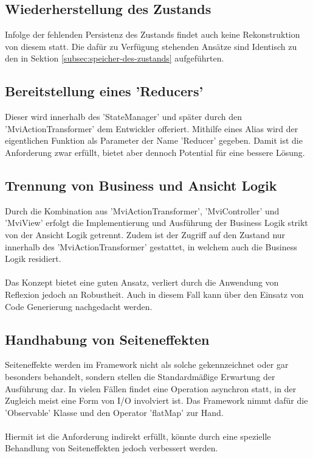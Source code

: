 \subsection{Wiederherstellung des Zustands}
Infolge der fehlenden Persistenz des Zustands findet auch keine Rekonstruktion von diesem statt. Die dafür zu Verfügung stehenden Ansätze sind Identisch zu den in Sektion
\ref{subsec:speicher-des-zustands}
aufgeführten.

\subsection{Bereitstellung eines 'Reducers'}
Dieser wird innerhalb des 'StateManager' und später durch den 'MviActionTransformer' dem Entwickler offeriert. Mithilfe eines Alias wird der eigentlichen Funktion als Parameter der Name 'Reducer' gegeben.
Damit ist die Anforderung zwar erfüllt, bietet aber dennoch Potential für eine bessere Lösung.


\subsection{Trennung von Business und Ansicht Logik}
Durch die Kombination aus 'MviActionTransformer', 'MviController' und 'MviView' erfolgt die Implementierung und Ausführung der Business Logik strikt von der Ansicht Logik getrennt. Zudem ist der Zugriff auf den Zustand nur innerhalb des 'MviActionTransformer' gestattet, in welchem auch die Business Logik residiert. 
\\\\
Das Konzept bietet eine guten Ansatz, verliert durch die Anwendung von Reflexion jedoch an Robustheit. Auch in diesem Fall kann über den Einsatz von Code Generierung nachgedacht werden.

\subsection{Handhabung von Seiteneffekten}
Seiteneffekte werden im Framework nicht als solche gekennzeichnet oder gar besonders behandelt, sondern stellen die Standardmäßige Erwartung der Ausführung dar. In vielen Fällen findet eine Operation asynchron statt, in der Zugleich meist eine Form von I/O involviert ist. Das Framework nimmt dafür die 'Observable' Klasse und den Operator 'flatMap' zur Hand.
\\\\
Hiermit ist die Anforderung indirekt erfüllt, könnte durch eine spezielle Behandlung von Seiteneffekten jedoch verbessert werden.

